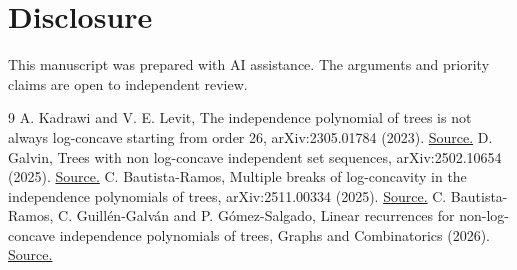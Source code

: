 \documentclass[11pt]{article}
\begin{document}
\section*{Disclosure}
This manuscript was prepared with AI assistance. The arguments and priority claims are open to independent review.

\begin{thebibliography}{9}
 A. Kadrawi and V. E. Levit, The independence polynomial of trees is not always log-concave starting from order 26, arXiv:2305.01784 (2023). \href{https://arxiv.org/abs/2305.01784}{Source.}
 D. Galvin, Trees with non log-concave independent set sequences, arXiv:2502.10654 (2025). \href{https://arxiv.org/abs/2502.10654}{Source.}
 C. Bautista-Ramos, Multiple breaks of log-concavity in the independence polynomials of trees, arXiv:2511.00334 (2025). \href{https://arxiv.org/abs/2511.00334}{Source.}
 C. Bautista-Ramos, C. Guillén-Galván and P. Gómez-Salgado, Linear recurrences for non-log-concave independence polynomials of trees, Graphs and Combinatorics (2026). \href{https://doi.org/10.1007/s00373-026-03054-4}{Source.}
\end{thebibliography}
\end{document}
